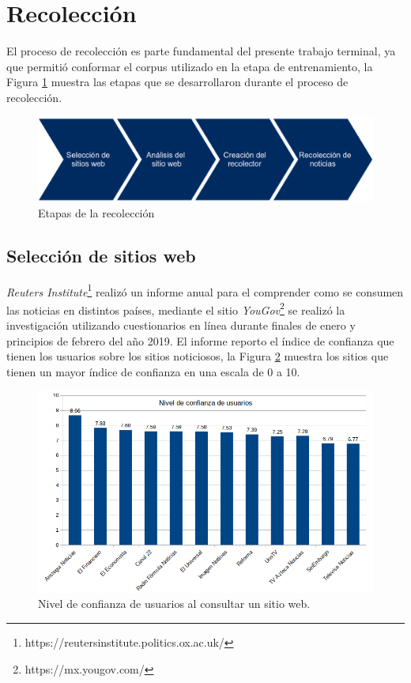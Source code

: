 \section{Recolección}


El proceso de recolección es parte fundamental del presente trabajo terminal, ya que permitió conformar el corpus utilizado en la etapa de entrenamiento, la Figura \ref{fig:etapRecoleccion} muestra las etapas que se desarrollaron durante el proceso de recolección.\\

\begin{figure}[H]
	\centering
	\includegraphics[scale=.30]{imagenes/Capitulo5/etapasRecoleccion.png}
	\caption{Etapas de la recolección}
	\label{fig:etapRecoleccion}
\end{figure}

\subsection{Selección de sitios web}
\textit{Reuters Institute}\footnote{https://reutersinstitute.politics.ox.ac.uk/} realizó un informe anual para el comprender como se consumen las noticias en distintos países, mediante el sitio \textit{YouGov}\footnote{https://mx.yougov.com/} se realizó la investigación utilizando cuestionarios en línea durante finales de enero y principios de febrero del año 2019. El informe reporto el índice de confianza que tienen los usuarios sobre los sitios noticiosos, la Figura \ref{fig:nivConfianza} muestra los sitios que tienen un mayor índice de confianza en una escala de 0 a 10.  

\begin{figure}[H]
  \centering
  \includegraphics[scale=.35]{imagenes/Capitulo5/nivelConfianza.png}
  \caption{Nivel de confianza de usuarios al consultar un sitio web.}
  \label{fig:nivConfianza}
\end{figure}

